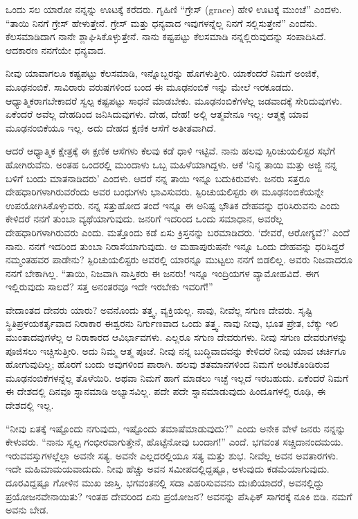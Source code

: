ಒಂದು ಸಲ ಯಾರೋ ನನ್ನನ್ನು ಊಟಕ್ಕೆ ಕರೆದರು. ಗೃಹಿಣಿ “ಗ್ರೇಸ್ (grace) ಹೇಳಿ ಊಟಕ್ಕೆ ಮುಂಚೆ” ಎಂದಳು. “ತಾಯಿ ನಿನಗೆ ಗ್ರೇಸ್ ಹೇಳುತ್ತೇನೆ. ಗ್ರೇಸ್ ಮತ್ತು ಧನ್ಯವಾದ ಇವುಗಳನ್ನೆಲ್ಲ ನಿನಗೆ ಸಲ್ಲಿಸುತ್ತೇನೆ'' ಎಂದೆನು. ಕೆಲಸಮಾಡಿದಾಗ ನಾನೇ ಶ್ಲಾಘಿಸಿಕೊಳ್ಳುತ್ತೇನೆ. ನಾನು ಕಷ್ಟಪಟ್ಟು ಕೆಲಸಮಾಡಿ ನನ್ನಲ್ಲಿರುವುದನ್ನು ಸಂಪಾದಿಸಿದೆ. ಆದಕಾರಣ ನನಗೆಯೇ ಧನ್ಯವಾದ.

ನೀವು ಯಾವಾಗಲೂ ಕಷ್ಟಪಟ್ಟು ಕೆಲಸಮಾಡಿ, ಇನ್ನೊಬ್ಬರನ್ನು ಹೊಗಳುತ್ತೀರಿ. ಯಾಕೆಂದರೆ ನಿಮಗೆ ಅಂಜಿಕೆ, ಮೂಢನಂಬಿಕೆ. ಸಾವಿರಾರು ವರುಷಗಳಿಂದ ಬಂದ ಈ ಮೂಢನಂಬಿಕೆ ಇನ್ನು ಮೇಲೆ ಇರಕೂಡದು. ಆಧ್ಯಾತ್ಮಿಕರಾಗಬೇಕಾದರೆ ಸ್ವಲ್ಪ ಕಷ್ಟಪಟ್ಟು ಸಾಧನೆ ಮಾಡಬೇಕು. ಮೂಢನಂಬಿಕೆಗಳೆಲ್ಲ ಜಡವಾದಕ್ಕೆ ಸೇರಿದುವುಗಳು. ಏಕೆಂದರೆ ಅವೆಲ್ಲ ದೇಹದಿಂದ ಜನಿಸಿದುವುಗಳು. ದೇಹ, ದೇಹ! ಅಲ್ಲಿ ಆತ್ಮವೇನೂ ಇಲ್ಲ: ಆತ್ಮಕ್ಕೆ ಯಾವ ಮೂಢನಂಬಿಕೆಯೂ ಇಲ್ಲ. ಅದು ದೇಹದ ಕ್ಷಣಿಕ ಆಸೆಗೆ ಅತೀತವಾಗಿದೆ.

ಆದರೆ ಆಧ್ಯಾತ್ಮಿಕ ಕ್ಷೇತ್ರಕ್ಕೆ ಈ ಕ್ಷಣಿಕ ಆಸೆಗಳು ಕೆಲವು ಕಡೆ ಧಾಳಿ ಇಟ್ಟಿವೆ. ನಾನು ಹಲವು ಸ್ಪಿರಿಚುಯಲಿಸ್ಟರ ಸಭೆಗೆ ಹೋಗಿರುವೆನು. ಅಂತಹ ಒಂದರಲ್ಲಿ ಮುಂದಾಳು ಒಬ್ಬ ಮಹಿಳೆಯಾಗಿದ್ದಳು. ಆಕೆ `ನಿನ್ನ ತಾಯಿ ಮತ್ತು ಅಜ್ಜಿ ನನ್ನ ಬಳಿಗೆ ಬಂದು ಮಾತನಾಡಿದರು' ಎಂದಳು. ಆದರೆ ನನ್ನ ತಾಯಿ ಇನ್ನೂ ಬದುಕಿರುವಳು. ಜನರು ಸತ್ತರೂ ದೇಹಧಾರಿಗಳಾಗಿರುವರೆಂದು ಅವರ ಬಂಧುಗಳು ಭಾವಿಸುವರು. ಸ್ಪಿರಿಚುಯಲಿಸ್ಟರು ಈ ಮೂಢನಂಬಿಕೆಯನ್ನೇ ಉಪಯೋಗಿಸಿಕೊಳ್ಳುವರು. ನನ್ನ ಸತ್ತುಹೋದ ತಂದೆ ಇನ್ನೂ ಈ ಅನಿಷ್ಟ ಭೌತಿಕ ದೇಹವನ್ನು ಧರಿಸಿರುವನು ಎಂದು ಕೇಳಿದರೆ ನನಗೆ ತುಂಬಾ ವ್ಯಥೆಯಾಗುವುದು. ಜನರಿಗೆ ಇದರಿಂದ ಒಂದು ಸಮಾಧಾನ, ಅವರೆಲ್ಲ ದೇಹಧಾರಿಗಳಾಗಿರುವರು ಎಂದು. ಮತ್ತೊಂದು ಕಡೆ ಏಸು ಕ್ರಿಸ್ತನನ್ನು ಬರಮಾಡಿದರು. `ದೇವರೆ, ಆರೋಗ್ಯವೆ?' ಎಂದೆ ನಾನು. ನನಗೆ ಇದರಿಂದ ತುಂಬಾ ನಿರಾಸೆಯಾಗುವುದು. ಆ ಮಹಾಪುರುಷನೇ ಇನ್ನೂ ಒಂದು ದೇಹವನ್ನು ಧರಿಸಿದ್ದರೆ ನಮ್ಮಂತಹವರ ಪಾಡೇನು? ಸ್ಪಿರಿಚುಯಲಿಸ್ಟರು ಅವರಲ್ಲಿ ಯಾರನ್ನೂ ಮುಟ್ಟಲು ನನಗೆ ಬಿಡಲಿಲ್ಲ. ಅವರು ನಿಜವಾದರೂ ನನಗೆ ಬೇಕಾಗಿಲ್ಲ. “ತಾಯಿ, ನಿಜವಾಗಿ ನಾಸ್ತಿಕರು ಈ ಜನರು! ಇನ್ನೂ ಇಂದ್ರಿಯಗಳ ವ್ಯಾಮೋಹವಿದೆ. ಈಗ ಇಲ್ಲಿರುವುದು ಸಾಲದೆ? ಸತ್ತ ಅನಂತರವೂ ಇದೇ ಇರಬೇಕು ಇವರಿಗೆ!”

ವೇದಾಂತದ ದೇವರು ಯಾರು? ಅವನೊಂದು ತತ್ತ್ವ, ವ್ಯಕ್ತಿಯಲ್ಲ. ನಾವು, ನೀವೆಲ್ಲ ಸಗುಣ ದೇವರು. ಸೃಷ್ಟಿ ಸ್ಥಿತಿಪ್ರಳಯಕರ್ತೃವಾದ ನಿರಾಕಾರ ಈಶ್ವರನು ನಿರ್ಗುಣವಾದ ಒಂದು ತತ್ತ್ವ. ನಾವು ನೀವು, ಭೂತ ಪ್ರೇತ, ಬೆಕ್ಕು ಇಲಿ ಮುಂತಾದವುಗಳೆಲ್ಲ ಆ ನಿರಾಕಾರದ ಆವಿರ್ಭಾವಗಳು. ಎಲ್ಲರೂ ಸಗುಣ ದೇವರುಗಳು. ನೀವು ಸಗುಣ ದೇವರುಗಳನ್ನು ಪೂಜಿಸಲು ಇಚ್ಚಿಸುತ್ತೀರಿ. ಅದು ನಿಮ್ಮ ಆತ್ಮ ಪೂಜೆ. ನೀವು ನನ್ನ ಬುದ್ಧಿವಾದವನ್ನು ಕೇಳಿದರೆ ನೀವು ಯಾವ ಚರ್ಚಿಗೂ ಹೋಗುವುದಿಲ್ಲ; ಹೊರಗೆ ಬಂದು ಅವುಗಳಿಂದ ಪಾರಾಗಿ. ಹಲವು ಶತಮಾನಗಳಿಂದ ನಿಮಗೆ ಅಂಟಿಕೊಂಡಿರುವ ಮೂಢನಂಬಿಕೆಗಳನ್ನೆಲ್ಲ ತೊಳೆಯಿರಿ. ಅಥವಾ ನಿಮಗೆ ಹಾಗೆ ಮಾಡಲು ಇಚ್ಛೆ ಇಲ್ಲದೆ ಇರಬಹುದು. ಏಕೆಂದರೆ ನಿಮಗೆ ಈ ದೇಶದಲ್ಲಿ ದಿನವೂ ಸ್ನಾನಮಾಡಿ ಅಭ್ಯಾಸವಿಲ್ಲ. ಪದೇ ಪದೇ ಸ್ನಾನಮಾಡುವುದು ಹಿಂದೂಗಳಲ್ಲಿ ರೂಢಿ, ಈ ದೇಶದಲ್ಲಿ ಇಲ್ಲ.

“ನೀವು ಏತಕ್ಕೆ ಇಷ್ಟೊಂದು ನಗುವುದು, ಇಷ್ಟೊಂದು ತಮಾಷೆಮಾಡುವುದು?'' ಎಂದು ಅನೇಕ ವೇಳೆ ಜನರು ನನ್ನನ್ನು ಕೇಳುವರು. “ನಾನು ಸ್ವಲ್ಪ ಗಂಭೀರವಾಗುತ್ತೇನೆ, ಹೊಟ್ಟೆನೋವು ಬಂದಾಗ!” ಎಂದೆ. ಭಗವಂತ ಸಚ್ಚಿದಾನಂದಮಯ. ಇರುವ\break ವಸ್ತುಗಳಲ್ಲೆಲ್ಲಾ ಅವನೇ ಸತ್ಯ. ಅವನೇ ಎಲ್ಲದರಲ್ಲಿಯೂ ಸತ್ಯ ಮತ್ತು ಶುಭ. ನೀವೆಲ್ಲ ಅವನ ಅವತಾರಗಳು. ಇದೇ ಮಹಿಮಾಮಯವಾದುದು. ನೀವು ಹೆಚ್ಚು ಅವನ ಸಮೀಪ\-ದಲ್ಲಿದ್ದಷ್ಟೂ, ಅಳುವುದು ಕಡಮೆಯಾಗುವುದು. ದೂರವಿದ್ದಷ್ಟೂ ಗೋಳಿನ ಮುಖ ಜಾಸ್ತಿ. ಭಗವಂತನಲ್ಲಿ ಸದಾ ವಿಹರಿಸುವವನು ದುಃಖಿಯಾದರೆ, ಅವನಲ್ಲಿದ್ದು ಪ್ರಯೋಜನವೇನಾಯಿತು? ಇಂತಹ ದೇವರಿಂದ ಏನು ಪ್ರಯೋಜನ? ಅವನನ್ನು ಪೆಸಿಫಿಕ್ ಸಾಗರಕ್ಕೆ ನೂಕಿ ಬಿಡಿ. ನಮಗೆ ಅವನು ಬೇಡ.

